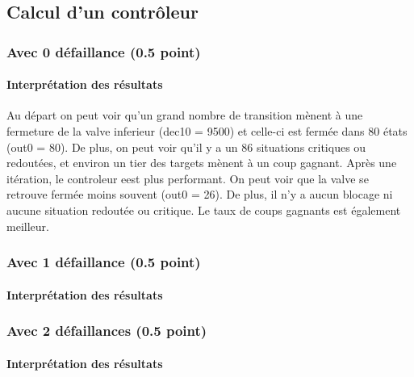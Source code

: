 \documentclass[a4paper]{book}
\begin{document}
\subsection{Calcul d'un contrôleur}
\subsubsection{Avec 0 défaillance (0.5 point)}



%
%
\paragraph{Interprétation des résultats}
Au départ on peut voir qu'un grand nombre de transition mènent à une fermeture de la valve inferieur (dec10 = 9500) et celle-ci est fermée dans 80 états (out0 = 80). De plus, on peut voir qu'il y a un 86 situations critiques ou redoutées, et environ un tier des targets mènent à un coup gagnant.
Après une itération, le controleur eest plus performant. On peut voir que la valve se retrouve fermée moins souvent (out0 = 26). De plus, il n'y a aucun blocage ni aucune situation redoutée ou critique. Le taux de coups gagnants est également meilleur.


\subsubsection{Avec 1 défaillance (0.5 point)}




%
\paragraph{Interprétation des résultats}

\subsubsection{Avec 2 défaillances (0.5 point)}





\paragraph{Interprétation des résultats}
\end{document}
